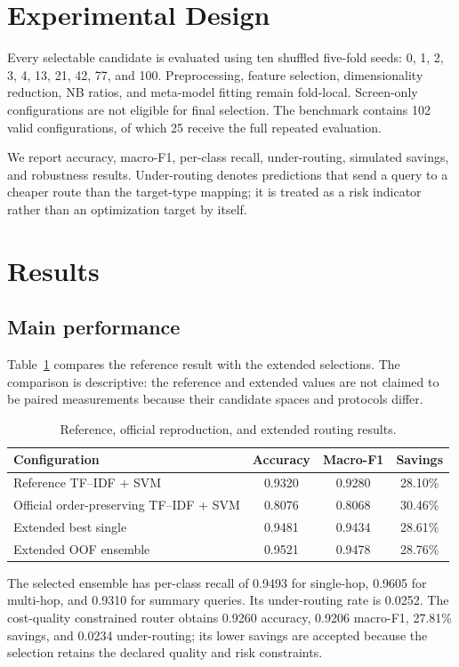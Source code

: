\documentclass[conference]{IEEEtran}
\begin{document}
\section{Experimental Design}
Every selectable candidate is evaluated using ten shuffled five-fold seeds: 0, 1, 2, 3, 4, 13, 21, 42, 77, and 100. Preprocessing, feature selection, dimensionality reduction, NB ratios, and meta-model fitting remain fold-local. Screen-only configurations are not eligible for final selection. The benchmark contains 102 valid configurations, of which 25 receive the full repeated evaluation.

We report accuracy, macro-F1, per-class recall, under-routing, simulated savings, and robustness results. Under-routing denotes predictions that send a query to a cheaper route than the target-type mapping; it is treated as a risk indicator rather than an optimization target by itself.

\section{Results}
\subsection{Main performance}
Table~\ref{tab:main} compares the reference result with the extended selections. The comparison is descriptive: the reference and extended values are not claimed to be paired measurements because their candidate spaces and protocols differ.

\begin{table}[t]
\centering
\small
\setlength{\tabcolsep}{2.5pt}
\caption{Reference, official reproduction, and extended routing results.}
\label{tab:main}
\begin{tabular}{p{}ccc}
\toprule
Configuration & Accuracy & Macro-F1 & Savings \\
\midrule
Reference TF--IDF + SVM & 0.9320 & 0.9280 & 28.10\% \\
Official order-preserving TF--IDF + SVM & 0.8076 & 0.8068 & 30.46\% \\
Extended best single & 0.9481 & 0.9434 & 28.61\% \\
Extended OOF ensemble & 0.9521 & 0.9478 & 28.76\% \\
\bottomrule
\end{tabular}
\end{table}

The selected ensemble has per-class recall of 0.9493 for single-hop, 0.9605 for multi-hop, and 0.9310 for summary queries. Its under-routing rate is 0.0252. The cost-quality constrained router obtains 0.9260 accuracy, 0.9206 macro-F1, 27.81\% savings, and 0.0234 under-routing; its lower savings are accepted because the selection retains the declared quality and risk constraints.
\end{document}
